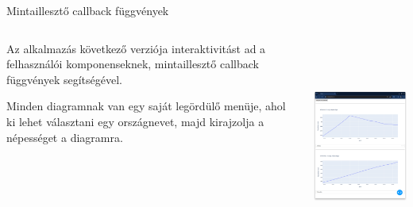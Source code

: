 \documentclass[english, aspectratio=169]{beamer}
\begin{document}
\begin{frame}[fragile]{Mintaillesztő callback függvények}
	\begin{columns}
		\begin{column}{.5\textwidth}
			Az alkalmazás következő verziója interaktivitást ad a felhasználói komponenseknek, mintaillesztő callback függvények segítségével.\par\smallskip
			Minden diagramnak van egy saját legördülő menüje, ahol ki lehet választani egy országnevet, majd kirajzolja a népességet a diagramra. 
		\end{column}
		\begin{column}{.5\textwidth}
			\begin{center}
				\includegraphics[width=7cm, height=7cm, keepaspectratio]{images/adv_3.png}
			\end{center}
		\end{column}
	\end{columns}
\end{frame}
\end{document}
